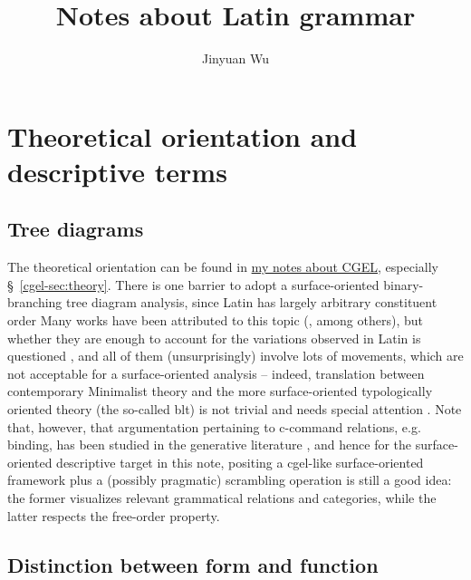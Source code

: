 \documentclass{article}
\title{Notes about Latin grammar}
\author{Jinyuan Wu}
\newcommand*{\citesec}[1]{\S~{#1}}
\newcommand{\cgel}{\href{../English/cambridge.pdf}{my notes about CGEL}}
\begin{document}
\maketitle

\automath

\section{Theoretical orientation and descriptive terms}

\subsection{Tree diagrams}

The theoretical orientation can be found in \cgel, especially \citesec{\ref{cgel-sec:theory}}.
There is one barrier to adopt a surface-oriented binary-branching tree diagram analysis,
since Latin has largely arbitrary constituent order 
Many works have been attributed to this topic 
(\citealt{danckaert2011left,devine2006latin}, among others),
but whether they are enough to account for the variations observed in Latin is questioned
\citep{spevak2007latin},
and all of them (unsurprisingly) involve lots of movements,
which are not acceptable for a surface-oriented analysis --
indeed, translation between contemporary Minimalist theory 
and the more surface-oriented typologically oriented theory (the so-called \ac{blt})
is not trivial and needs special attention \citep{clausetypology}.
Note that, however, that argumentation pertaining to c-command relations, e.g. binding,
has been studied in the generative literature \citep{mateu2017latin},
and hence for the surface-oriented descriptive target in this note,
positing a \acs{cgel}-like surface-oriented framework 
plus a (possibly pragmatic) scrambling operation is still a good idea:
the former visualizes relevant grammatical relations and categories,
while the latter respects the free-order property.

\subsection{Distinction between form and function}
\end{document}
